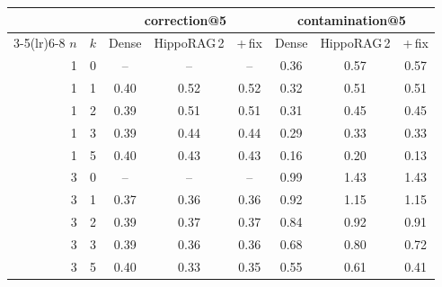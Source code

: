 \begin{tabular}{rr ccc ccc}
\toprule
 & & \multicolumn{3}{c}{correction@5} & \multicolumn{3}{c}{contamination@5} \\
\cmidrule(lr){3-5}\cmidrule(lr){6-8}
$n$ & $k$ & Dense & HippoRAG\,2 & +\,fix & Dense & HippoRAG\,2 & +\,fix \\
\midrule
1 & 0 & -- & -- & -- & 0.36 & 0.57 & 0.57 \\
1 & 1 & 0.40 & 0.52 & 0.52 & 0.32 & 0.51 & 0.51 \\
1 & 2 & 0.39 & 0.51 & 0.51 & 0.31 & 0.45 & 0.45 \\
1 & 3 & 0.39 & 0.44 & 0.44 & 0.29 & 0.33 & 0.33 \\
1 & 5 & 0.40 & 0.43 & 0.43 & 0.16 & 0.20 & 0.13 \\
3 & 0 & -- & -- & -- & 0.99 & 1.43 & 1.43 \\
3 & 1 & 0.37 & 0.36 & 0.36 & 0.92 & 1.15 & 1.15 \\
3 & 2 & 0.39 & 0.37 & 0.37 & 0.84 & 0.92 & 0.91 \\
3 & 3 & 0.39 & 0.36 & 0.36 & 0.68 & 0.80 & 0.72 \\
3 & 5 & 0.40 & 0.33 & 0.35 & 0.55 & 0.61 & 0.41 \\
\bottomrule
\end{tabular}
